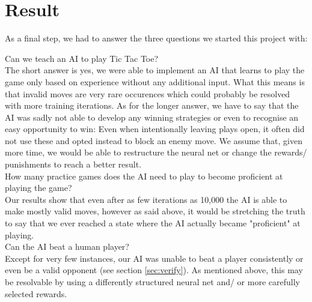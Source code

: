 \section{Result}
As a final step, we had to answer the three questions we started this project with:

Can we teach an \ac{AI} to play Tic Tac Toe? \\
The short answer is yes, we were able to implement an \ac{AI} that learns to play the game only based on experience without any additional input. What this means is that invalid moves are very rare occurences which could probably be resolved with more training iterations.
As for the longer answer, we have to say that the \ac{AI} was sadly not able to develop any winning strategies or even to recognise an easy opportunity to win: Even when intentionally leaving plays open, it often did not use these and opted instead to block an enemy move.
We assume that, given more time, we would be able to restructure the neural net or change the rewards/ punishments to reach a better result.
\\

How many practice games does the \ac{AI} need to play to become proficient at playing the game? \\
Our results show that even after as few iterations as 10,000 the \ac{AI} is able to make mostly valid moves, however as said above, it would be stretching the truth to say that we ever reached a state where the \ac{AI} actually became "proficient" at playing.
\\

Can the \ac{AI} beat a human player? \\
Except for very few instances, our \ac{AI} was unable to beat a player consistently or even be a valid opponent (see section \ref{sec:verify}). As mentioned above, this may be resolvable by using a differently structured neural net and/ or more carefully selected rewards.